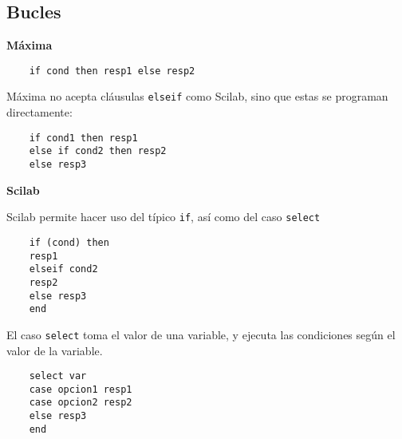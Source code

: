 \documentclass[a4paper]{article}
\begin{document}
\subsection{Bucles}
\begin{multicols}{2}
	\begin{center}
		\textbf{Máxima}
	\end{center}
	
	\begin{verbatim}
	if cond then resp1 else resp2
	\end{verbatim}
	
	Máxima no acepta cláusulas \verb|elseif| como Scilab, sino que estas se programan directamente:
	
	\begin{verbatim}
	if cond1 then resp1 
	else if cond2 then resp2 
	else resp3
	\end{verbatim}
	\columnbreak
	
	\begin{center}
		\textbf{Scilab}
	\end{center}
	Scilab permite hacer uso del típico \verb|if|, así como del caso \verb|select|
	\begin{verbatim}
	if (cond) then 
	resp1 
	elseif cond2
	resp2
	else resp3
	end
	\end{verbatim}
	
	El caso \verb|select| toma el valor de una variable, y ejecuta las condiciones según el valor de la variable.
	\begin{verbatim}
	select var
	case opcion1 resp1
	case opcion2 resp2
	else resp3
	end
	\end{verbatim}
\end{multicols}
\end{document}
